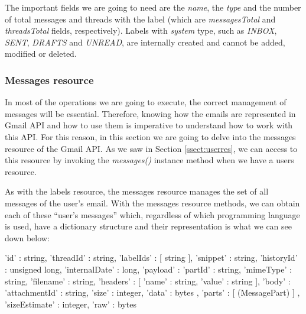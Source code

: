The important fields we are going to need are the \textit{name}, the \textit{type} and the number of total messages and threads with the label (which are \textit{messagesTotal} and \textit{threadsTotal} fields, respectively). Labels with \textit{system} type, such as \textit{INBOX}, \textit{SENT}, \textit{DRAFTS} and \textit{UNREAD}, are internally created and cannot be added, modified or deleted.

\subsubsection{Messages resource}\label{sssect:msgres}
In most of the operations we are going to execute, the correct management of messages will be essential. Therefore, knowing how the emails are represented in Gmail API and how to use them is imperative to understand how to work with this API. For this reason, in this section we are going to delve into the messages resource \citep[/v1/reference/users/messages]{gmailAPI} of the Gmail API. As we saw in Section \ref{ssect:userres}, we can access to this resource by invoking the \textit{messages()} instance method when we have a users resource.

As with the labels resource, the messages resource manages the set of all messages of the user's email. With the messages resource methods, we can obtain each of these ``user's messages'' which, regardless of which programming language is used, have a dictionary structure and their representation is what we can see down below:

\begin{python}
	{
		'id' : string,
		'threadId' : string,
		'labelIds' : [ string ],
		'snippet' : string,
		'historyId' : unsigned long,
		'internalDate' : long,
		'payload' : {
			'partId' : string,
			'mimeType' : string,
			'filename' : string,
			'headers' : [
			{
				'name' : string,
				'value' : string
			}
			],
			'body' : {
				'attachmentId' : string,
				'size' : integer,
				'data' : bytes
			},
			'parts' : [ (MessagePart) ]
		},
		'sizeEstimate' : integer,
		'raw' : bytes
	}
\end{python}

